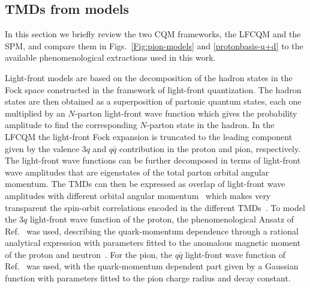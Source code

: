\documentclass[a4paper]{article}
\begin{document}
\subsection{TMDs from models}
\label{sec-2.5} 

In this section we briefly review the two CQM frameworks, the LFCQM 
and the SPM, and compare them in Figs.~\ref{Fig:pion-models} and 
\ref{protonbasis-u+d} to the available phenomenological extractions 
used in this work.

Light-front models are based on the  decomposition of the hadron states in 
the  Fock space constructed in the framework of light-front quantization.
The hadron states are then obtained as a superposition of partonic
quantum states, each one multiplied by an  $N$-parton light-front wave function 
which gives the probability amplitude to find the corresponding $N$-parton
state in the hadron. In the LFCQM the light-front Fock expansion is truncated
to the leading component given by the valence $3q$ and $q\bar q$ contribution
in the proton and pion, respectively.
The  light-front wave functions
can be further decomposed in terms of light-front wave amplitudes
that are eigenstates of the total parton orbital angular momentum. 
The TMDs can then be expressed as overlap of light-front wave amplitudes 
with different orbital angular momentum~\cite{Pasquini:2008ax} which makes
very transparent the spin-orbit correlations encoded in the different TMDs~\cite{Pasquini:2008ax,Pasquini:2010af,Boffi:2009sh,Pasquini:2011tk,Pasquini:2014ppa}.
To model the $3q$ light-front wave function 
of the proton, the phenomenological Ansatz 
of Ref.~\cite{Schlumpf:1992pp} was used, describing the quark-momentum dependence
through a rational analytical expression with parameters fitted to the
anomalous magnetic moment of the proton and
neutron~\cite{Schlumpf:1992pp,Pasquini:2007iz}.
For the pion, the $q\bar q$ 
light-front wave function of Ref.~\cite{Schlumpf:1994bc} was used, 
with the quark-momentum dependent part given by a Gaussian function 
with parameters fitted to the pion charge radius and decay constant.
\end{document}
